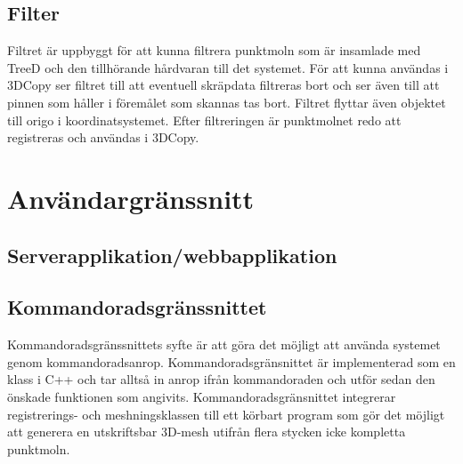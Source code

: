 \documentclass[a4paper,titlepage,12pt]{article}
\begin{document}
	
	\subsection{Filter}
		Filtret är uppbyggt för att kunna filtrera punktmoln som är insamlade med TreeD och den tillhörande hårdvaran till det systemet. För att kunna användas i 3DCopy ser filtret till att eventuell skräpdata filtreras bort och ser även till att pinnen som håller i föremålet som skannas tas bort. Filtret flyttar även objektet till origo i koordinatsystemet. Efter filtreringen är punktmolnet redo att registreras och användas i 3DCopy.
		
\newpage
 
\section{Användargränssnitt}
	\subsection{Serverapplikation/webbapplikation}
	
	\subsection{Kommandoradsgränssnittet}
		Kommandoradsgränssnittets syfte är att göra det möjligt att använda systemet genom kommandoradsanrop. Kommandoradsgränsnittet är implementerad som en klass i C++ och tar alltså in anrop ifrån kommandoraden och utför sedan den önskade funktionen som angivits. Kommandoradsgränsnittet integrerar registrerings- och meshningsklassen till ett körbart program som gör det möjligt att generera en utskriftsbar 3D-mesh utifrån flera stycken icke kompletta punktmoln.
	
\newpage
\end{document}
